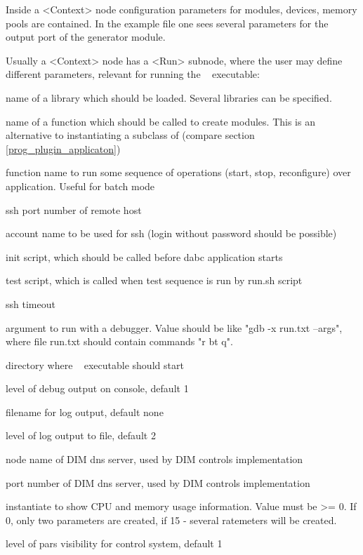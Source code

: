 Inside a <Context> node configuration parameters for modules, devices, memory pools are
contained.
In the example file one sees several parameters for the output port of 
the generator module.  

Usually a <Context> node has a <Run> subnode, where the user may define different parameters, relevant for running the \dabc~ executable:

\bdes
\item[lib] name of a library which should be loaded. Several libraries can be specified.
\item[func] name of a function which should be called to create modules. 
This is an alternative to instantiating a subclass of  
(compare section \ref{prog_plugin_applicaton})
\item[runfunc] function name to run some sequence of operations (start, stop, reconfigure) over application. Useful
for batch mode                 
\item[port] ssh port number of remote host
\item[user] account name to be used for ssh (login without password should be possible)
\item[init] init script, which should be called before dabc application starts
\item[test] test script, which is called when test sequence is run by run.sh script
\item[timeout] ssh timeout 
\item[debugger] argument to run with a debugger. Value should be like "gdb -x run.txt --args", where file run.txt should contain commands "r bt q".
\item[workdir] directory where \dabc~ executable should start
\item[debuglevel] level of debug output on console, default 1
\item[logfile] filename for log output, default none  
\item[loglevel] level of log output to file, default 2 
\item[DIM\_DNS\_NODE] node name of DIM dns server, used by DIM controls implementation 
\item[DIM\_DNS\_PORT] port number of DIM dns server, used by DIM controls implementation
\item[cpuinfo] instantiate  to show CPU and memory usage information. 
Value must be >= 0. If 0, only two parameters are created, if 15 - several ratemeters will be created.    
\item[parslevel] level of pars visibility for control system, default 1 
\edes

